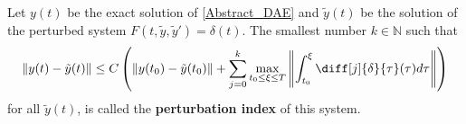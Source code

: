 %	

	\bgroup
	\begin{frame}{}
	\end{frame}
	\egroup


\begin{frame}[noframenumbering]
	\vfill
	\begin{definition}%
		Let $y(t)$ be the exact solution of \eqref{Abstract_DAE} and $\tilde{y}(t)$ be the solution of the perturbed system $F(t, \tilde{y}, \tilde{y}') = \delta(t)$. The smallest number $k \in \mathbb{N}$ such that 
		\begin{displaymath}
			\|y(t)-\tilde{y}(t)\| \leq C \left(\|y(t_0)-\tilde{y}(t_0)\|+\sum_{j=0}^{k}\max_{t_0 \leq \xi \leq T} \left\rVert 		\int_{t_0}^{\xi}\diff[j]{\delta}{\tau}(\tau)d \tau \right\rVert \right)
		\end{displaymath}
		for all $\tilde{y}(t)$, is called the \textbf{perturbation index} of this system.
	\end{definition}
	\vfill
\end{frame}

